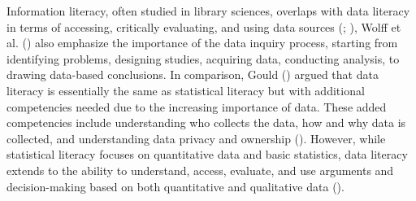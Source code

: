 \documentclass[
  12pt,
  a4paper,
  twoside]{article}
\begin{document}
Information literacy, often studied in library sciences, overlaps with data literacy in terms of accessing, critically evaluating, and using data sources (; ), Wolff et al. () also emphasize the importance of the data inquiry process, starting from identifying problems, designing studies, acquiring data, conducting analysis, to drawing data-based conclusions.
In comparison, Gould () argued that data literacy is essentially the same as statistical literacy but with additional competencies needed due to the increasing importance of data. These added competencies include understanding who collects the data, how and why data is collected, and understanding data privacy and ownership ().
However, while statistical literacy focuses on quantitative data and basic statistics, data literacy extends to the ability to understand, access, evaluate, and use arguments and decision-making based on both quantitative and qualitative data ().
\end{document}
